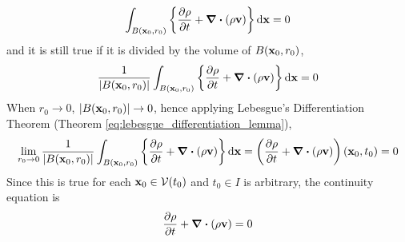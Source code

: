 \begin{equation}
	\int_{B(\vb{x}_0, r_0)} \left\{ \frac{\partial \rho}{\partial t} + \div(\rho \vb{v}) \right\} \dd{\vb{x}} = 0
\end{equation}
and it is still true if it is divided by the volume of $B(\vb{x}_0, r_0)$,
\begin{equation}
	\frac{1}{\abs{B(\vb{x}_0, r_0)}}
	\int_{B(\vb{x}_0, r_0)} \left\{ \frac{\partial \rho}{\partial t} + \div(\rho \vb{v}) \right\} \dd{\vb{x}} = 0
\end{equation}
When $r_0 \to 0$, $\abs{B(\vb{x}_0, r_0)} \to 0$, hence applying Lebesgue's Differentiation Theorem (Theorem \ref{eq:lebesgue_differentiation_lemma}),
\begin{equation}
	\lim_{r_0 \to 0}
	\frac{1}{\abs{B(\vb{x}_0, r_0)}}
	\int_{B(\vb{x}_0, r_0)} \left\{ \frac{\partial \rho}{\partial t} + \div(\rho \vb{v}) \right\} \dd{\vb{x}} = 
	\left( \frac{\partial \rho}{\partial t} + \div(\rho \vb{v}) \right) (\vb{x}_0, t_0) = 0
\end{equation}
Since this is true for each $\vb{x}_0 \in \mathcal{V}(t_0)$ and $t_0 \in I$ is arbitrary, the continuity equation is
\begin{equation}
	\pdv{\rho}{t} + \div(\rho \vb{v}) = 0
\end{equation}

